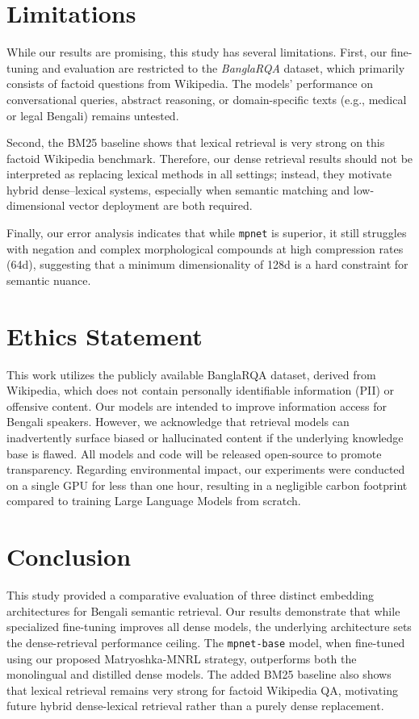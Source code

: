 \documentclass[manuscript,screen,review]{acmart}
\begin{document}
\section{Limitations}

While our results are promising, this study has several limitations. First, our fine-tuning and evaluation are restricted to the \textit{BanglaRQA} dataset, which primarily consists of factoid questions from Wikipedia. The models' performance on conversational queries, abstract reasoning, or domain-specific texts (e.g., medical or legal Bengali) remains untested. 

Second, the BM25 baseline shows that lexical retrieval is very strong on this factoid Wikipedia benchmark. Therefore, our dense retrieval results should not be interpreted as replacing lexical methods in all settings; instead, they motivate hybrid dense--lexical systems, especially when semantic matching and low-dimensional vector deployment are both required.

Finally, our error analysis indicates that while \texttt{mpnet} is superior, it still struggles with negation and complex morphological compounds at high compression rates (64d), suggesting that a minimum dimensionality of 128d is a hard constraint for semantic nuance.


\section{Ethics Statement}

This work utilizes the publicly available BanglaRQA dataset, derived from Wikipedia, which does not contain personally identifiable information (PII) or offensive content. Our models are intended to improve information access for Bengali speakers. However, we acknowledge that retrieval models can inadvertently surface biased or hallucinated content if the underlying knowledge base is flawed. All models and code will be released open-source to promote transparency. Regarding environmental impact, our experiments were conducted on a single GPU for less than one hour, resulting in a negligible carbon footprint compared to training Large Language Models from scratch.

\section{Conclusion}

This study provided a comparative evaluation of three distinct embedding architectures for Bengali semantic retrieval. Our results demonstrate that while specialized fine-tuning improves all dense models, the underlying architecture sets the dense-retrieval performance ceiling. The \texttt{mpnet-base} model, when fine-tuned using our proposed Matryoshka-MNRL strategy, outperforms both the monolingual and distilled dense models. The added BM25 baseline also shows that lexical retrieval remains very strong for factoid Wikipedia QA, motivating future hybrid dense-lexical retrieval rather than a purely dense replacement.
\end{document}
